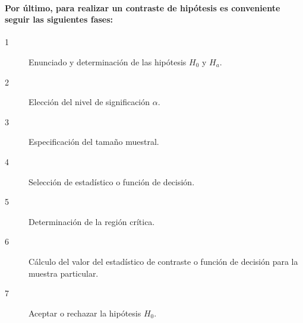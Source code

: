 \paragraph{
Por último, para realizar un contraste de hipótesis es conveniente seguir las siguientes fases:
}
\begin{description}
\item[1] Enunciado y determinación de las hipótesis $H_0$ y $H_a$.
\item[2] Elección del nivel de significación $\alpha$.
\item[3] Especificación del tamaño muestral.
\item[4] Selección de estadístico o función de decisión.
\item[5] Determinación de la región crítica.
\item[6] Cálculo del valor del estadístico de contraste o función de decisión para la muestra particular.
\item[7] Aceptar o rechazar la hipótesis $H_0$.
\end{description}